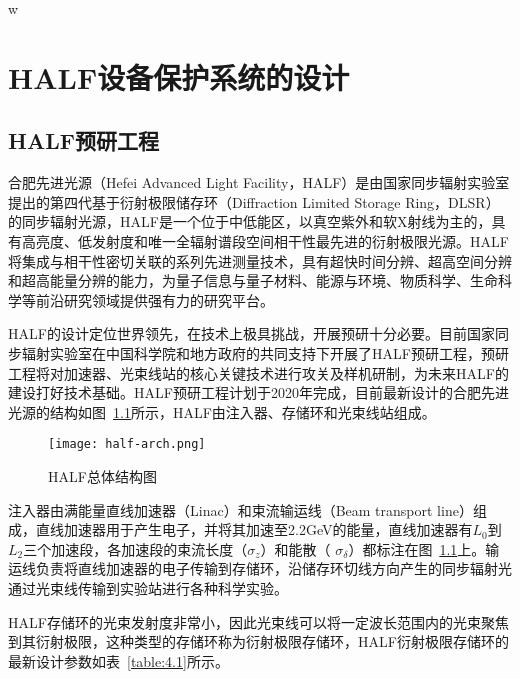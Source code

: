 w%

\chapter{HALF设备保护系统的设计}

\section{HALF预研工程}

合肥先进光源（Hefei Advanced Light Facility，HALF）是由国家同步辐射实验室提出的第四代基于衍射极限储存环（Diffraction Limited Storage Ring，DLSR）的同步辐射光源，HALF是一个位于中低能区，以真空紫外和软X射线为主的，具有高亮度、低发射度和唯一全辐射谱段空间相干性最先进的衍射极限光源。HALF将集成与相干性密切关联的系列先进测量技术，具有超快时间分辨、超高空间分辨和超高能量分辨的能力，为量子信息与量子材料、能源与环境、物质科学、生命科学等前沿研究领域提供强有力的研究平台。

HALF的设计定位世界领先，在技术上极具挑战，开展预研十分必要。目前国家同步辐射实验室在中国科学院和地方政府的共同支持下开展了HALF预研工程，预研工程将对加速器、光束线站的核心关键技术进行攻关及样机研制，为未来HALF的建设打好技术基础。HALF预研工程计划于2020年完成，目前最新设计的合肥先进光源的结构如图~\ref{fig:half-arch}所示，HALF由注入器、存储环和光束线站组成。

\begin{figure}[!htb]
	\centering
	\texttt{[image: half-arch.png]}
	\caption{HALF总体结构图}
	\label{fig:half-arch}
\end{figure}

注入器由满能量直线加速器（Linac）和束流输运线（Beam transport line）组成，直线加速器用于产生电子，并将其加速至2.2GeV的能量，直线加速器有$L_{0}$到$L_{2}$三个加速段，各加速段的束流长度（$\sigma_{z}$）和能散（ $\sigma_{\delta}$）都标注在图~\ref{fig:half-arch}上。输运线负责将直线加速器的电子传输到存储环，沿储存环切线方向产生的同步辐射光通过光束线传输到实验站进行各种科学实验。

HALF存储环的光束发射度非常小，因此光束线可以将一定波长范围内的光束聚焦到其衍射极限，这种类型的存储环称为衍射极限存储环，HALF衍射极限存储环的最新设计参数如表~\ref{table:4.1}所示。

